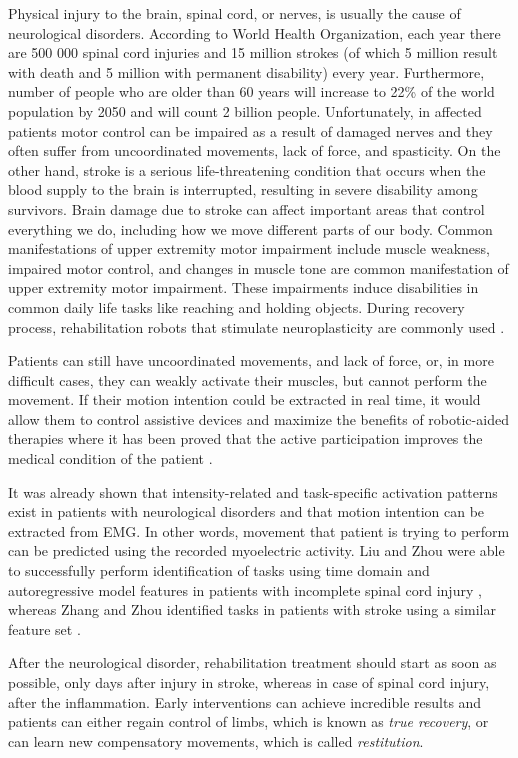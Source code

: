 Physical injury to the brain, spinal cord, or nerves, is usually the cause of neurological disorders. According to World Health Organization, each year there are 500 000 spinal cord injuries and 15 million strokes (of which 5 million result with death and 5 million with permanent disability) every year. Furthermore, number of people who are older than 60 years will increase to 22\% of the world population by 2050 and will count 2 billion people. Unfortunately, in affected patients motor control can be impaired as a result of damaged nerves and they often suffer from uncoordinated movements, lack of force, and spasticity. On the other hand, stroke is a serious life-threatening condition that occurs when the blood supply to the brain is interrupted, resulting in severe disability among survivors. Brain damage due to stroke can affect important areas that control everything we do, including how we move different parts of our body. Common manifestations of upper extremity motor impairment include muscle weakness, impaired motor control, and changes in muscle tone are common manifestation of upper extremity motor impairment. These impairments induce disabilities in common daily life tasks like reaching and holding objects. During recovery process, rehabilitation robots that stimulate neuroplasticity are commonly used \citep{VacaBenitez2013, Dipietro2005, Marchal-Crespo2009}. 

Patients can still have uncoordinated movements, and lack of force, or, in more difficult cases, they can weakly activate their muscles, but cannot perform the movement. If their motion intention could be extracted in real time, it would allow them to control assistive devices and maximize the benefits of robotic-aided therapies where it has been proved that the active participation improves the medical condition of the patient \citep{Hogan2006}.

It was already shown that intensity-related and task-specific activation patterns exist in patients with neurological disorders and that motion intention can be extracted from EMG. In other words, movement that patient is trying to perform can be predicted using the recorded myoelectric activity. Liu and Zhou were able to successfully perform identification of tasks using time domain and autoregressive model features in patients with incomplete spinal cord injury \citep{Liu2013}, whereas Zhang and Zhou identified tasks in patients with stroke using a similar feature set \citep{Zhang2012}.

After the neurological disorder, rehabilitation treatment should start as soon as possible, only days after injury in stroke, whereas in case of spinal cord injury, after the inflammation. Early interventions can achieve incredible results and patients can either regain control of limbs, which is known as \emph{true recovery}, or can learn new compensatory movements, which is called \emph{restitution}. 

